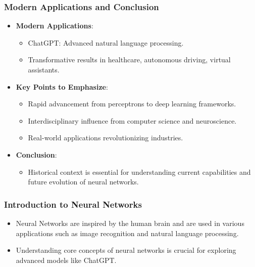 \documentclass[aspectratio=169]{beamer}
\begin{document}
\begin{frame}[fragile]
    \frametitle{Modern Applications and Conclusion}
    \begin{itemize}
        \item \textbf{Modern Applications}:
        \begin{itemize}
            \item ChatGPT: Advanced natural language processing.
            \item Transformative results in healthcare, autonomous driving, virtual assistants.
        \end{itemize}
        
        \item \textbf{Key Points to Emphasize}:
        \begin{itemize}
            \item Rapid advancement from perceptrons to deep learning frameworks.
            \item Interdisciplinary influence from computer science and neuroscience.
            \item Real-world applications revolutionizing industries.
        \end{itemize}
        
        \item \textbf{Conclusion}:
        \begin{itemize}
            \item Historical context is essential for understanding current capabilities and future evolution of neural networks.
        \end{itemize}
    \end{itemize}
\end{frame}

\begin{frame}[fragile]
    \frametitle{Introduction to Neural Networks}
    \begin{itemize}
        \item Neural Networks are inspired by the human brain and are used in various applications such as image recognition and natural language processing.
        \item Understanding core concepts of neural networks is crucial for exploring advanced models like ChatGPT.
    \end{itemize}
\end{frame}
\end{document}

